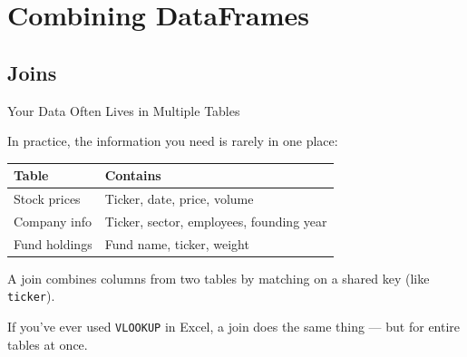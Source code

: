 \documentclass[9pt,aspectratio=169]{beamer}
\begin{document}
\section{Combining DataFrames}
\subsection{Joins}

\begin{frame}{Your Data Often Lives in Multiple Tables}

In practice, the information you need is rarely in one place:

\medskip

\begin{tabular}{@{}lp{7.5cm}@{}}
\toprule
\textbf{Table} & \textbf{Contains} \\
\midrule
Stock prices & Ticker, date, price, volume \\[0.3em]
Company info & Ticker, sector, employees, founding year \\[0.3em]
Fund holdings & Fund name, ticker, weight \\
\bottomrule
\end{tabular}

\bigskip

A \alert{join} combines columns from two tables by matching on a shared key (like \texttt{ticker}).

\bigskip

\begin{highlightbox}
\centering
If you've ever used \texttt{VLOOKUP} in Excel, a join does the same thing --- but for entire tables at once.
\end{highlightbox}

\end{frame}
\end{document}
